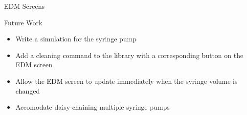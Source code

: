 \documentclass[a0paper,landscape,fontscale=0.32]{baposter}
\begin{document}
\begin{poster}
\begin{posterbox}[name=edmscreenexp,column=3,below=edmimage]{EDM Screens}
\end{posterbox}
\begin{posterbox}[name=futurework,column=3,above=bottom]{Future Work}
 \begin{itemize}
    \item Write a simulation for the syringe pump
    \item Add a cleaning command to the library with a corresponding button on the EDM screen
    \item Allow the EDM screen to update immediately when the syringe volume is changed
    \item Accomodate daisy-chaining multiple syringe pumps
\end{itemize}
\end{posterbox}

\end{poster}
\end{document}
